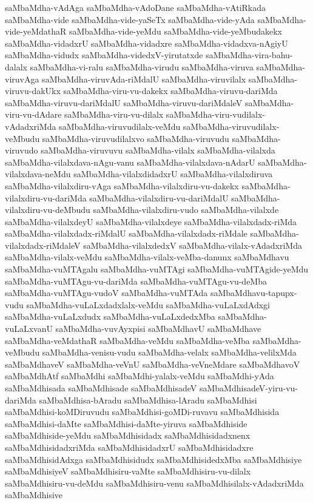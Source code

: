 {saMbaMdha-vAdAga
saMbaMdha-vAdoDane
saMbaMdha-vAtiRkada
saMbaMdha-vide
saMbaMdha-vide-yaSeTx
saMbaMdha-vide-yAda
saMbaMdha-vide-yeMdathaR
saMbaMdha-vide-yeMdu
saMbaMdha-vide-yeMbudakekx
saMbaMdha-vidadxrU
saMbaMdha-vidadxre
saMbaMdha-vidadxva-nAgiyU
saMbaMdha-vidudx
saMbaMdha-videdxV-yirutatxde
saMbaMdha-vira-bahu-dalalx
saMbaMdha-vi-ralu
saMbaMdha-virudu
saMbaMdha-viruva
saMbaMdha-viruvAga
saMbaMdha-viruvAda-riMdalU
saMbaMdha-viruvilalx
saMbaMdha-viruvu-dakUkx
saMbaMdha-viru-vu-dakekx
saMbaMdha-viruvu-dariMda
saMbaMdha-viruvu-dariMdalU
saMbaMdha-viruvu-dariMdaleV
saMbaMdha-viru-vu-dAdare
saMbaMdha-viru-vu-dilalx
saMbaMdha-viru-vudilalx-vAdadxriMda
saMbaMdha-viruvudilalx-veMdu
saMbaMdha-viruvudilalx-veMbudu
saMbaMdha-viruvudilalxvo
saMbaMdha-viruvudu
saMbaMdha-viruvudo
saMbaMdha-viruvuvu
saMbaMdha-vilalx
saMbaMdha-vilalxda
saMbaMdha-vilalxdava-nAgu-vanu
saMbaMdha-vilalxdava-nAdarU
saMbaMdha-vilalxdava-neMdu
saMbaMdha-vilalxdidadxrU
saMbaMdha-vilalxdiruva
saMbaMdha-vilalxdiru-vAga
saMbaMdha-vilalxdiru-vu-dakekx
saMbaMdha-vilalxdiru-vu-dariMda
saMbaMdha-vilalxdiru-vu-dariMdalU
saMbaMdha-vilalxdiru-vu-deMbudu
saMbaMdha-vilalxdiru-vudo
saMbaMdha-vilalxde
saMbaMdha-vilalxdeyU
saMbaMdha-vilalxdeye
saMbaMdha-vilalxdadx-riMda
saMbaMdha-vilalxdadx-riMdalU
saMbaMdha-vilalxdadx-riMdale
saMbaMdha-vilalxdadx-riMdaleV
saMbaMdha-vilalxdedxV
saMbaMdha-vilalx-vAdadxriMda
saMbaMdha-vilalx-veMdu
saMbaMdha-vilalx-veMba-danunx
saMbaMdhavu
saMbaMdha-vuMTAgalu
saMbaMdha-vuMTAgi
saMbaMdha-vuMTAgide-yeMdu
saMbaMdha-vuMTAgu-vu-dariMda
saMbaMdha-vuMTAgu-vu-deMba
saMbaMdha-vuMTAgu-vudoV
saMbaMdha-vuMTAda
saMbaMdhavu-tapupx-vudu
saMbaMdha-vuLaLxdadxlalx-veMdu
saMbaMdha-vuLaLxdAdxgi
saMbaMdha-vuLaLxdudx
saMbaMdha-vuLaLxdedxMba
saMbaMdha-vuLaLxvanU
saMbaMdha-vuvAyxpisi
saMbaMdhavU
saMbaMdhave
saMbaMdha-veMdathaR
saMbaMdha-veMdu
saMbaMdha-veMba
saMbaMdha-veMbudu
saMbaMdha-venisu-vudu
saMbaMdha-velalx
saMbaMdha-velilxMda
saMbaMdhaveV
saMbaMdha-veVnU
saMbaMdha-veVneMdare
saMbaMdhavoV
saMbaMdhAtf
saMbaMdhi
saMbaMdhi-yalalx-veMdu
saMbaMdhi-yAda
saMbaMdhisada
saMbaMdhisade
saMbaMdhisadeV
saMbaMdhisadeV-yiru-vu-dariMda
saMbaMdhisa-bAradu
saMbaMdhisa-lAradu
saMbaMdhisi
saMbaMdhisi-koMDiruvudu
saMbaMdhisi-goMDi-ruvavu
saMbaMdhisida
saMbaMdhisi-daMte
saMbaMdhisi-daMte-yiruva
saMbaMdhiside
saMbaMdhiside-yeMdu
saMbaMdhisidadx
saMbaMdhisidadxnenx
saMbaMdhisidadxriMda
saMbaMdhisidadxrU
saMbaMdhisidadxre
saMbaMdhisidAdxga
saMbaMdhisidudx
saMbaMdhisidedxMba
saMbaMdhisiye
saMbaMdhisiyeV
saMbaMdhisiru-vaMte
saMbaMdhisiru-vu-dilalx
saMbaMdhisiru-vu-deMdu
saMbaMdhisiru-venu
saMbaMdhisilalx-vAdadxriMda
saMbaMdhisive
}
